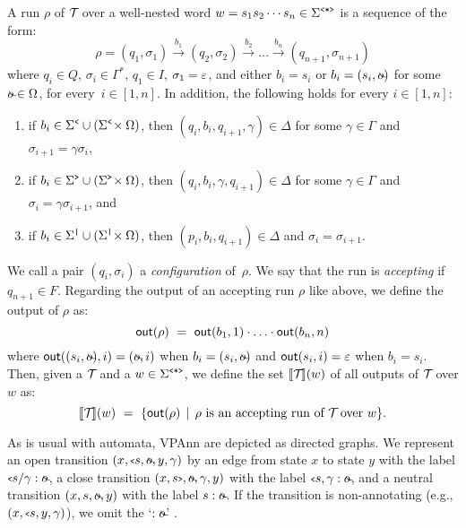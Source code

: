A run $\rho$ of $\mathcal{T}\!$ over a well-nested word $w = s_1s_2\cdots s_n \in\Sigma^{\texttt{<*>}}$ %
is a sequence of the form:
$$
\rho = (q_1, \sigma_1) \xrightarrow{b_1} (q_2, \sigma_2) \xrightarrow{b_2} \ldots  \xrightarrow{b_n} (q_{n+1}, \sigma_{n+1})
$$
where $q_i \in Q$, $\sigma_i\in \Gamma^{*}$, $q_1 \in I$, $\sigma_1 = \varepsilon$, and either $b_i = s_i$ or $b_i = (s_i, \oout)$ for some $\oout \in \oalph$, for every~$i\in[1,n]$. In addition, the following holds for every $i\in[1,n]$:
\begin{enumerate}
	\item if $b_{i} \in \Sigma^{\texttt{<}} \cup (\Sigma^{\texttt{<}} \!\times \Omega)$, then $(q_i, b_i,q_{i+1},\gamma) \in \Delta$ for some $\gamma\in\Gamma$ and $\sigma_{i+1} = \gamma\sigma_i$,
	\item if $b_{i} \in \Sigma^{\texttt{>}} \cup (\Sigma^{\texttt{>}} \!\times \Omega)$, then $(q_i, b_i, \gamma, q_{i+1}) \in \Delta$ for some $\gamma\in\Gamma$ and $\sigma_i = \gamma\sigma_{i+1}$, and
	\item if $b_{i} \in \Sigma^{\texttt{|}} \cup (\Sigma^{\texttt{|}} \!\times \Omega)$, then $(p_i, b_i,q_{i+1})\in \Delta$ and $\sigma_i = \sigma_{i+1}$. 
\end{enumerate}
We call a pair $(q_i, \sigma_i)$ a \emph{configuration} of~$\rho$. We say that the run is \emph{accepting} if~$q_{n+1}\in F$. 
Regarding the output of an accepting run $\rho$ like above, we define the output of $\rho$ as:
$$
\textsf{out}(\rho) \ = \  \textsf{out}(b_1,1)\cdot \ldots \cdot \textsf{out}(b_n, n)
$$
where $\out((s_i,\oout), i) = (\oout,i)$ when $b_i = (s_i,\oout)$ and $\textsf{out}(s_i, i) = \varepsilon$ when $b_i = s_i$. 
Then, given a \vpann $\mathcal{T}\!$ and a $w \in\Sigma^{\texttt{<*>}}$, we define the set ${\llbracket{\mathcal{T}\!}\rrbracket}(w)$ of all outputs of $\mathcal{T}\!$ over $w$ as:
$$
{\llbracket{\mathcal{T}\!}\rrbracket}(w) \ = \ \{ \textsf{out}(\rho) \, \mid \, \text{$\rho$ is an accepting run of $\mathcal{T}\!$ over $w$}\}.
$$

As is usual with automata, VPAnn are depicted as directed graphs. We represent an open transition $(x,\op{s},\oout, y,\gamma)$ by an edge from state $x$ to state $y$ with the label $\op{s} / \gamma:\oout$, a close transition $(x,\cl{s},\oout,\gamma,y)$ with the label $\op{s} \,\! ,\,\!  \gamma:\oout$, and a neutral transition $(x,s,\oout,y)$ with the label $s:\oout$. If the transition is non-annotating (e.g., $(x,{\scriptsize\texttt{<}} s, y,\gamma)$), we omit the `$: \oout$' .

